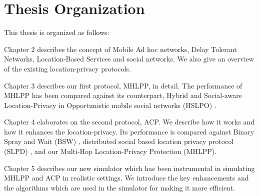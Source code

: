 \section{Thesis Organization}

\noindent This thesis is organized as follows:

Chapter 2 describes the concept of Mobile Ad hoc networks, Delay Tolerant Networks, Location-Based Services and social networks. We also give an overview of the existing location-privacy protocols.

Chapter 3 describes our first protocol, MHLPP, in detail. The performance of MHLPP has been compared against its counterpart, Hybrid and Social-aware Location-Privacy in Opportunistic mobile social networks (HSLPO) \cite {C17}.

Chapter 4 elaborates on the second protocol, ACP. We describe how it works and how it enhances the location-privacy. Its performance is compared against Binary Spray and Wait (BSW) \cite{C31}, distributed social based location privacy protocol (SLPD) \cite{C16}, and our Multi-Hop Location-Privacy Protection (MHLPP).

Chapter 5 describes our new simulator which has been instrumental in simulating MHLPP and ACP in realistic settings. We introduce the key enhancements and the algorithms which are used in the simulator for making it more efficient.



\begin{comment}


\begin{figure}[H]
  \centering  
  \texttt{[image: figures/map2.pdf]}
  \caption{A map showing the organization of the thesis}
\end{figure}

\end{comment}
